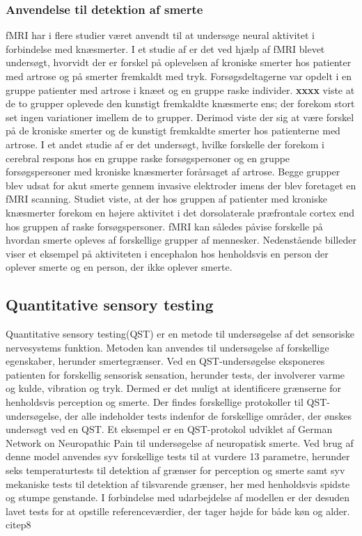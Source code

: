 \subsubsection{Anvendelse til detektion af smerte}
fMRI har i flere studier været anvendt til at undersøge neural aktivitet i forbindelse med knæsmerter.
I et studie af \citep{Parks2012} er det ved hjælp af fMRI blevet undersøgt, hvorvidt der er forskel på oplevelsen af kroniske smerter hos patienter med artrose og på smerter fremkaldt med tryk. Forsøgsdeltagerne var opdelt i en gruppe patienter med artrose i knæet og en gruppe raske individer. \textbf{xxxx} viste at de to grupper oplevede den kunstigt fremkaldte knæsmerte ens; der forekom stort set ingen variationer imellem de to grupper. Derimod viste der sig at være forskel på de kroniske smerter og de kunstigt fremkaldte smerter hos patienterne med artrose. \citep{Parks2012} 
I et andet studie af \citep{Hiramatsu2014} er det undersøgt, hvilke forskelle der forekom i cerebral respons hos en gruppe raske forsøgspersoner og en gruppe forsøgspersoner med kroniske knæsmerter forårsaget af artrose. Begge grupper blev udsat for akut smerte gennem invasive elektroder imens der blev foretaget en fMRI scanning. Studiet viste, at der hos gruppen af patienter med kroniske knæsmerter forekom en højere aktivitet i det dorsolaterale præfrontale cortex end hos gruppen af raske forsøgspersoner. \citep{Hiramatsu2014} 
fMRI kan således påvise forskelle på hvordan smerte opleves af forskellige grupper af mennesker. Nedenstående billeder viser et eksempel på aktiviteten i encephalon hos henholdsvis en person der oplever smerte og en person, der ikke oplever smerte. 

\subsection{Quantitative sensory testing}
Quantitative sensory testing(QST) er en metode til undersøgelse af det sensoriske nervesystems funktion. Metoden kan anvendes til undersøgelse af forskellige egenskaber, herunder smertegrænser. Ved en QST-undersøgelse eksponeres patienten for forskellig sensorisk sensation, herunder tests, der involverer varme og kulde, vibration og tryk. Dermed er det muligt at identificere grænserne for henholdsvis perception og smerte. \citep{Yarnitsky2006}
Der findes forskellige protokoller til QST-undersøgelse, der alle indeholder tests indenfor de forskellige områder, der ønskes undersøgt ved en QST. Et eksempel er en QST-protokol udviklet af German Network on Neuropathic Pain til undersøgelse af neuropatisk smerte. Ved brug af denne model anvendes syv forskellige tests til at vurdere 13 parametre, herunder seks temperaturtests til detektion af grænser for perception og smerte samt syv mekaniske tests til detektion af tilsvarende grænser, her med henholdsvis spidste og stumpe genstande. I forbindelse med udarbejdelse af modellen er der desuden lavet tests for at opstille referenceværdier, der tager højde for både køn og alder. citep{8}  

